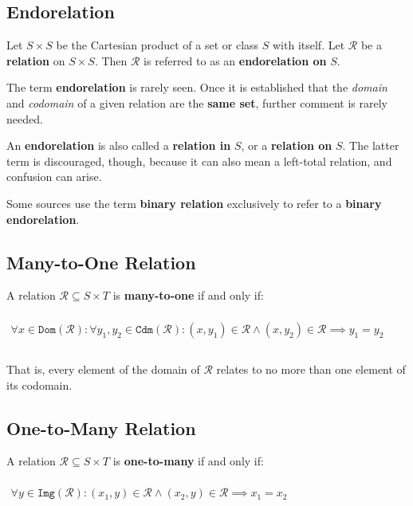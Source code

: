 \subsection{Endorelation}
\label{sec:endorelation}
Let $S \times S$ be the Cartesian product of a set or class $S$ with
itself. Let $\mathcal{R}$ be a \textbf{relation} on $S \times S$. Then
$\mathcal{R}$ is referred to as an \textbf{endorelation on} $S$.


The term \textbf{endorelation} is rarely seen. Once it is established
that the \textit{domain} and \textit{codomain} of a given relation are
the \textbf{same set}, further comment is rarely needed.


An \textbf{endorelation} is also called a \textbf{relation in} $S$, or
a \textbf{relation on} $S$. The latter term is discouraged, though,
because it can also mean a left-total relation, and confusion can
arise.

Some sources use the term \textbf{binary relation} exclusively to
refer to a \textbf{binary endorelation}.


\subsection{Many-to-One Relation}
\label{sec:many-to-one}

A relation $\mathcal{R} \subseteq S \times T$ is \textbf{many-to-one}
if and only if:

\begin{math}
  \begin{array}{c}
    \\
    \forall x \in \mathtt{Dom}(\mathcal{R}): \forall y_1, y_2 \in \mathtt{Cdm}(\mathcal{R}): (x, y_1) \in \mathcal{R} \land (x, y_2) \in \mathcal{R} \implies y_1 = y_2 \\
    \\
  \end{array}
\end{math}

That is, every element of the domain of $\mathcal{R}$ relates to no
more than one element of its codomain.

\subsection{One-to-Many Relation}
\label{sec:one-to-many}

A relation $\mathcal{R} \subseteq S \times T$ is \textbf{one-to-many}
if and only if:

\begin{math}
  \begin{array}{c}
    \\
    \forall y \in \mathtt{Img}(\mathcal{R}): (x_1, y) \in \mathcal{R} \land (x_2, y) \in \mathcal{R} \implies x_1 = x_2 \\
    \\
  \end{array}
\end{math}

